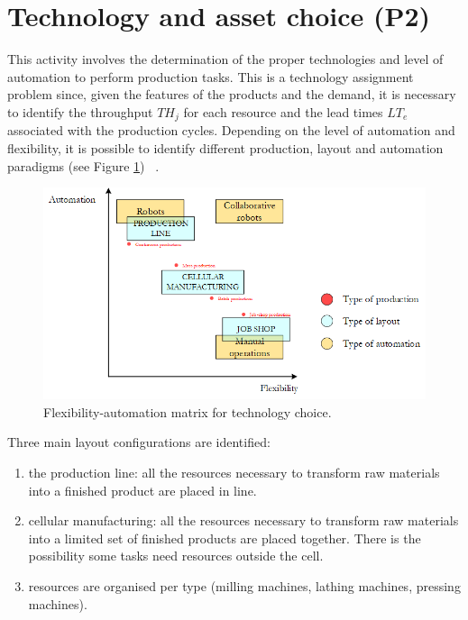 \section{Technology and asset choice (P2)} \label{secTechChoiceProd}
This activity involves the determination of the proper technologies and level of automation to perform production tasks. This is a technology assignment problem  since, given the features of the products and the demand, it is necessary to identify the throughput $TH_j$ for each resource and the lead times $LT_e$ associated with the production cycles. Depending on the level of automation and flexibility, it is possible to identify different production, layout and automation paradigms (see Figure \ref{fig_prod_flexauto1}) ~\cite{Groover2015}.


\begin{figure}[hbt!]
\centering
\includegraphics[width=1.0\textwidth]{sectionProduction/design_plant_figures/fig_prod_flexauto1.png}
\captionsetup{type=figure}
\caption{Flexibility-automation matrix for technology choice.}
\label{fig_prod_flexauto1}
\end{figure}

Three main layout configurations are identified:

\begin{enumerate}
    \item the production line: all the resources necessary to transform raw materials into a finished product are placed in line.
    \item cellular manufacturing: all the resources necessary to transform raw materials into a limited set of finished products are placed together. There is the possibility some tasks need resources outside the cell.
    \item resources are organised per type (milling machines, lathing machines, pressing machines).

\end{enumerate}


